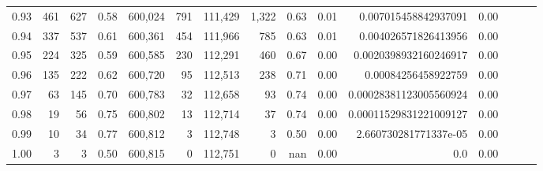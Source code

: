 \begin{tabular}{rrrrrrrrrrrrrrr}
0.93 &     461 &    627 &  0.58 &  600,024 &      791 &  111,429 &    1,322 &  0.63 &  0.01 &    0.007015458842937091 &      0.00 \\
0.94 &     337 &    537 &  0.61 &  600,361 &      454 &  111,966 &      785 &  0.63 &  0.01 &    0.004026571826413956 &      0.00 \\
0.95 &     224 &    325 &  0.59 &  600,585 &      230 &  112,291 &      460 &  0.67 &  0.00 &   0.0020398932160246917 &      0.00 \\
0.96 &     135 &    222 &  0.62 &  600,720 &       95 &  112,513 &      238 &  0.71 &  0.00 &     0.00084256458922759 &      0.00 \\
0.97 &      63 &    145 &  0.70 &  600,783 &       32 &  112,658 &       93 &  0.74 &  0.00 &  0.00028381123005560924 &      0.00 \\
0.98 &      19 &     56 &  0.75 &  600,802 &       13 &  112,714 &       37 &  0.74 &  0.00 &  0.00011529831221009127 &      0.00 \\
0.99 &      10 &     34 &  0.77 &  600,812 &        3 &  112,748 &        3 &  0.50 &  0.00 &   2.660730281771337e-05 &      0.00 \\
1.00 &       3 &      3 &  0.50 &  600,815 &        0 &  112,751 &        0 &   nan &  0.00 &                     0.0 &      0.00 \\
\bottomrule
\end{tabular}
